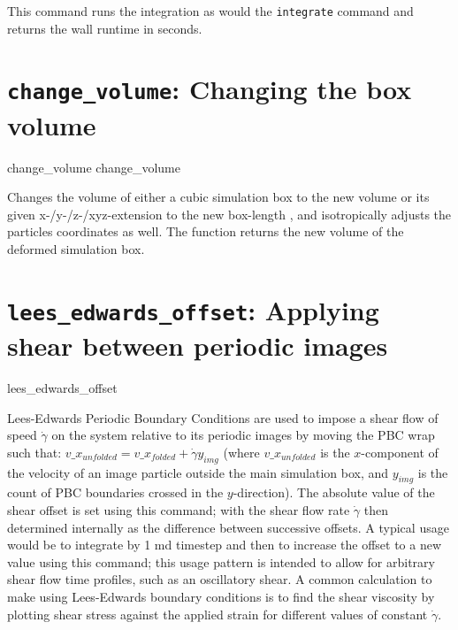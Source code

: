 This command runs the integration as would the \texttt{integrate} command and
returns the wall runtime in seconds.

\section{\texttt{change_volume}: Changing the box volume}

\begin{essyntax}
   change_volume  
   change_volume  
\end{essyntax}
Changes the volume of either a cubic simulation box to the new volume
 or its given x-/y-/z-/xyz-extension to the new
box-length , and isotropically adjusts the
particles coordinates as well. The function returns the new volume of
the deformed simulation box.

\section{\texttt{lees_edwards_offset}: Applying shear between periodic images}
\label{sec:lees_edwards}


\begin{essyntax}
   lees_edwards_offset   
  \begin{features}
  \end{features}

\end{essyntax}

Lees-Edwards Periodic Boundary Conditions are used to impose a shear flow of speed $\dot{\gamma}$ on the system relative to its periodic images by moving the PBC wrap such that:  $v\_x_{unfolded} =  v\_x_{folded} + \dot{\gamma} y_{img}$ (where $v\_x_{unfolded}$ is the $x$-component of the velocity of an image particle outside the main simulation box, and $y_{img}$ is the count of PBC boundaries crossed in the $y$-direction).  
The absolute value of the shear offset is set using this command; with the shear flow rate $\dot{\gamma}$ then determined internally as the difference between successive offsets.  
A typical usage would be to integrate by 1 md timestep and then to increase the offset to a new value using this command; this usage pattern is intended to allow for arbitrary shear flow time profiles, such as an oscillatory shear.  
A common calculation to make using Lees-Edwards boundary conditions is to find the shear viscosity by plotting shear stress against the applied strain for different values of constant $\dot{\gamma}$. 


